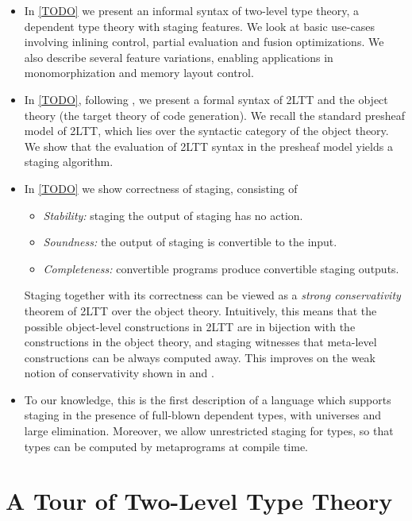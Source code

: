 \documentclass[acmsmall]{acmart}
\theoremstyle{remark}
\begin{document}
\begin{itemize}
  \item In \ref{TODO} we present an informal syntax of two-level type theory, a
    dependent type theory with staging features. We look at basic use-cases
    involving inlining control, partial evaluation and fusion optimizations. We
    also describe several feature variations, enabling applications in
    monomorphization and memory layout control.
  \item In \ref{TODO}, following \cite{twolevel}, we present a formal syntax of
    2LTT and the object theory (the target theory of code generation). We recall
    the standard presheaf model of 2LTT, which lies over the syntactic category
    of the object theory. We show that the evaluation of 2LTT syntax in the presheaf
    model yields a staging algorithm.
  \item In \ref{TODO} we show correctness of staging, consisting of
    \begin{itemize}
    \item \emph{Stability:} staging the output of staging has no action.
    \item \emph{Soundness:} the output of staging is convertible to the input.
    \item \emph{Completeness:} convertible programs produce convertible staging outputs.
    \end{itemize}
    Staging together with its correctness can be viewed as a \emph{strong
    conservativity} theorem of 2LTT over the object theory. Intuitively, this
    means that the possible object-level constructions in 2LTT are in bijection
    with the constructions in the object theory, and staging witnesses that
    meta-level constructions can be always computed away. This improves on the
    weak notion of conservativity shown in \cite{capriotti2017models} and
    \cite{twolevel}.
  \item To our knowledge, this is the first description of a language which
    supports staging in the presence of full-blown dependent types, with
    universes and large elimination. Moreover, we allow unrestricted staging
    for types, so that types can be computed by metaprograms at compile time.
\end{itemize}

\section{A Tour of Two-Level Type Theory}
\end{document}
